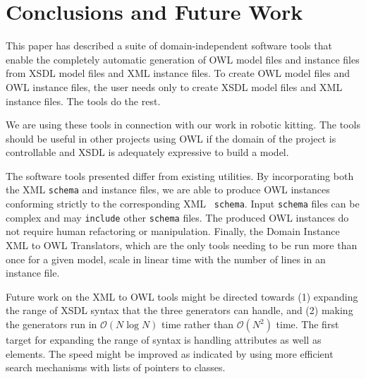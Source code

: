 \documentclass[preprint,12pt]{elsarticle}
\begin{document}
\section{Conclusions and Future Work}
\label{conclusion}

This paper has described a suite of domain-independent software tools that
enable the completely automatic generation of OWL model files and instance
files from XSDL model files and XML instance files. To create OWL model
files and OWL instance files, the user needs only to create XSDL model
files and XML instance files. The tools do the rest.

We are using these tools in connection with our work in robotic kitting.
The tools should be useful in other projects using OWL if the domain of the
project is controllable and XSDL is adequately expressive to build a model.

The software tools presented differ from existing utilities. By
incorporating both the XML {\tt schema} and instance files, we are able to
produce OWL instances conforming strictly to the corresponding XML {\tt
  schema}. Input {\tt schema} files can be complex and may {\tt include}
other {\tt schema} files. The produced OWL instances do not require human
refactoring or manipulation. Finally, the Domain Instance XML to OWL
Translators, which are the only tools needing to be run more than once for
a given model, scale in linear time with the number of lines in an
instance file.

Future work on the XML to OWL tools might be directed towards (1) expanding
the range of XSDL syntax that the three generators can handle, and (2)
making the generators run in $\mathcal{O}{(N \log N)}$ time rather than
$\mathcal{O}{(N^2)}$ time. The first target for expanding the range of
syntax is handling attributes as well as elements. The speed might be
improved as indicated by using more efficient search mechanisms with
lists of pointers to classes.




\end{document}
